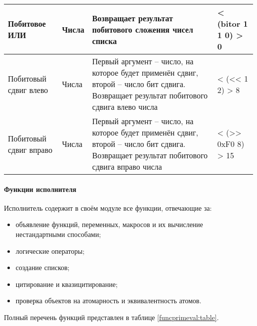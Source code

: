 \begin{xltabular}{\textwidth}{|p{3.6cm}|p{2cm}|p{6cm}|X|}
	Побитовое ИЛИ & Числа & Возвращает результат побитового сложения чисел списка & < (bitor 1 1 0) \linebreak > 0 \\ \hline 
	Побитовый сдвиг влево & Числа & Первый аргумент -- число, на которое будет применён сдвиг, второй -- число бит сдвига. Возвращает результат побитового сдвига влево числа & < (<< 1 2) \linebreak > 8 \\ \hline 
	Побитовый сдвиг вправо & Числа & Первый аргумент -- число, на которое будет применён сдвиг, второй -- число бит сдвига. Возвращает результат побитового сдвига вправо числа & < (>> 0xF0 8) \linebreak > 15
\end{xltabular}

\paragraph{Функции исполнителя}

Исполнитель содержит в своём модуле все функции, отвечающие за:
\begin{itemize}
	\item объявление функций, переменных, макросов и их вычисление нестандартными способами;
	\item логические операторы;
	\item создание списков;
	\item цитирование и квазицитирование;
	\item проверка объектов на атомарность и эквивалентность атомов.
\end{itemize}

Полный перечень функций представлен в таблице \ref{funcprimeval:table}.

